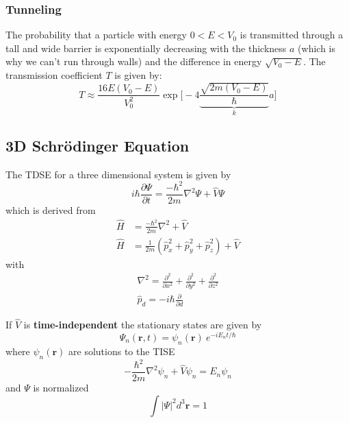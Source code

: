 \subsubsection{Tunneling}
The probability that a particle with energy $0<E<V_0$ is transmitted through a tall and wide barrier is exponentially decreasing with the thickness $a$ (which is why we can't run through walls) and the difference in energy $\sqrt{V_0-E}$. The transmission coefficient $T$ is given by:
\noindent\begin{equation*}
    T\approx\frac{16E(V_0-E)}{V_0^2}\exp\Biggl[-4 \underbrace{\frac{\sqrt{2m(V_0-E)}}{\hbar}}_{k} a\Biggr]
\end{equation*}

\subsection{3D Schrödinger Equation}
The TDSE for a three dimensional system is given by
\begin{equation*}
    i\hbar\frac{\partial\Psi}{\partial t} = \frac{-\hbar^2}{2m}\nabla^2\Psi + \widehat{V}\Psi
\end{equation*}
which is derived from
\begin{align*}
    \widehat{H} & = \frac{-\hbar^2}{2m}\nabla^2 + \widehat{V}                                                  \\
    \widehat{H} & = \frac{1}{2m}\left(\widehat{p}_x^2 + \widehat{p}_y^2 +\widehat{p}_z^2 \right) + \widehat{V}
\end{align*}
with
\begin{gather*}
    \nabla^2=\frac{\partial^2}{\partial x^2}+\frac{\partial^2}{\partial y^2}+\frac{\partial^2}{\partial z^2} \\
    \widehat{p}_d = -i\hbar\frac{\partial}{\partial d}
\end{gather*}

If $\widehat{V}$ is \textbf{time-independent} the stationary states are given by
\begin{equation*}
    \Psi_n(\mathbf{r},t)=\psi_n(\mathbf{r})\:e^{-iE_n t/\hbar}
\end{equation*}
where $\psi_n(\mathbf{r})$ are solutions to the TISE
\begin{equation*}
    -\frac{\hbar^2}{2m}\nabla^2\psi_n + \widehat{V}\psi_n = E_n \psi_n
\end{equation*}
and $\Psi$ is normalized
\noindent\begin{equation*}
    \int|\Psi|^2 d^3\mathbf{r}=1
\end{equation*}

